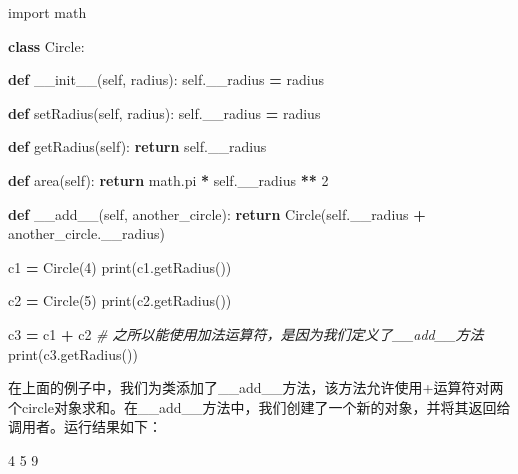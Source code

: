 \documentclass[]{ctexbook}
\newenvironment{Shaded}{\begin{snugshade}}{\end{snugshade}}
\newcommand{\BuiltInTok}[1]{#1}
\newcommand{\CommentTok}[1]{\textcolor[rgb]{0.56,0.35,0.01}{\textit{#1}}}
\newcommand{\ControlFlowTok}[1]{\textcolor[rgb]{0.13,0.29,0.53}{\textbf{#1}}}
\newcommand{\DecValTok}[1]{\textcolor[rgb]{0.00,0.00,0.81}{#1}}
\newcommand{\FunctionTok}[1]{\textcolor[rgb]{0.00,0.00,0.00}{#1}}
\newcommand{\ImportTok}[1]{#1}
\newcommand{\KeywordTok}[1]{\textcolor[rgb]{0.13,0.29,0.53}{\textbf{#1}}}
\newcommand{\NormalTok}[1]{#1}
\newcommand{\OperatorTok}[1]{\textcolor[rgb]{0.81,0.36,0.00}{\textbf{#1}}}
\newcommand{\VariableTok}[1]{\textcolor[rgb]{0.00,0.00,0.00}{#1}}
\begin{document}
\begin{Shaded}
\begin{Highlighting}[]
\ImportTok{import}\NormalTok{ math}

\KeywordTok{class}\NormalTok{ Circle:}

    \KeywordTok{def} \FunctionTok{__init__}\NormalTok{(}\VariableTok{self}\NormalTok{, radius):}
        \VariableTok{self}\NormalTok{.__radius }\OperatorTok{=}\NormalTok{ radius}

    \KeywordTok{def}\NormalTok{ setRadius(}\VariableTok{self}\NormalTok{, radius):}
        \VariableTok{self}\NormalTok{.__radius }\OperatorTok{=}\NormalTok{ radius}

    \KeywordTok{def}\NormalTok{ getRadius(}\VariableTok{self}\NormalTok{):}
        \ControlFlowTok{return} \VariableTok{self}\NormalTok{.__radius}

    \KeywordTok{def}\NormalTok{ area(}\VariableTok{self}\NormalTok{):}
        \ControlFlowTok{return}\NormalTok{ math.pi }\OperatorTok{*} \VariableTok{self}\NormalTok{.__radius }\OperatorTok{**} \DecValTok{2}

    \KeywordTok{def} \FunctionTok{__add__}\NormalTok{(}\VariableTok{self}\NormalTok{, another_circle):}
        \ControlFlowTok{return}\NormalTok{ Circle(}\VariableTok{self}\NormalTok{.__radius }\OperatorTok{+}\NormalTok{ another_circle.__radius)}

\NormalTok{c1 }\OperatorTok{=}\NormalTok{ Circle(}\DecValTok{4}\NormalTok{)}
\BuiltInTok{print}\NormalTok{(c1.getRadius())}

\NormalTok{c2 }\OperatorTok{=}\NormalTok{ Circle(}\DecValTok{5}\NormalTok{)}
\BuiltInTok{print}\NormalTok{(c2.getRadius())}

\NormalTok{c3 }\OperatorTok{=}\NormalTok{ c1 }\OperatorTok{+}\NormalTok{ c2  }\CommentTok{# 之所以能使用加法运算符，是因为我们定义了__add__方法}
\BuiltInTok{print}\NormalTok{(c3.getRadius())}
\end{Highlighting}
\end{Shaded}

在上面的例子中，我们为类添加了\_\_add\_\_方法，该方法允许使用+运算符对两个circle对象求和。在\_\_add\_\_方法中，我们创建了一个新的对象，并将其返回给调用者。运行结果如下：

\begin{Shaded}
\begin{Highlighting}[]
\DecValTok{4}
\DecValTok{5}
\DecValTok{9}
\end{Highlighting}
\end{Shaded}
\end{document}
